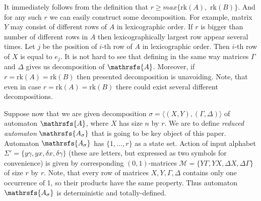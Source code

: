 \documentclass[11pt]{llncs}
\newcommand{\A}{\mathrsfs{A}}
\newcommand{\AD}{\mathrsfs{A_{\sigma}}}
\newcommand{\G}{\Gamma}
\newcommand{\D}{\Delta}
\newcommand{\g}{\gamma}
\newcommand{\dl}{\delta}
\newcommand{\rk}{\mathrm{rk}}
\begin{document}
It immediately follows from the definition that $r \geq max\{\rk(A),$ $\rk(B)\}$.
And for any such $r$ we can easily construct some decomposition. 
For example, matrix $Y$ may consist of different rows of $A$ in lexicographic order.
If $r$ is bigger than number of different rows in $A$ then lexicographically largest row 
appear several times. Let $j$ be the position of $i$-th row of $A$ in lexicographic order.
Then $i$-th row of $X$ is equal to $e_j$. It is not hard to see that defining in the 
same way matrices $\G$ and $\D$ gives us decomposition of $\A$. Moreover,
if $r = \rk(A) = \rk(B)$ then presented decomposition is unavoiding. Note, that even in case
$r = \rk(A) = \rk(B)$ there could exist several different decompositions.

Suppose now that we are given decomposition $\sigma = \langle(X,Y), (\G,\D)\rangle$ of 
automaton $\A$, where $X$ has size $n$ by $r$.
We are to define \emph{reduced automaton} $\AD$ that is going to be key object of this paper.
Automaton $\AD$ has $\{1,\ldots, r\}$ as a state
set. Action of input alphabet $\Sigma' = \{ y\g, yx, \dl x, \dl\g \}$ (these are letters, 
but expressed as two symbols for convenience) is given
by corresponding $(0,1)$-matrices $\mathcal{M} =\{ Y\G , YX, \D X, \D\G \}$ of size $r$ by $r$.
Note, that every row of matrices $X, Y, \G, \D$ contains only one occurrence of 1, 
so their products have the same property. Thus automaton $\AD$
is deterministic and totally-defined.

\end{document}
